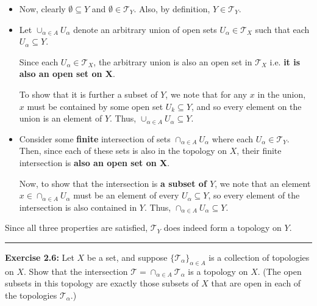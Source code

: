 \documentclass{article}
\begin{document}
\begin{itemize}
  \item Now, clearly $\emptyset \subseteq Y$ and $\emptyset \in \mathcal T_{Y}$. Also, by definition, $Y \in \mathcal T_Y$.
  \vskip 0.25cm

  \item Let $\cup_{\alpha \in A} U_{\alpha}$ denote an arbitrary union of open sets $U_{\alpha} \in \mathcal T_X$ such that each $U_{\alpha} \subseteq Y$.
  
  Since each $U_{\alpha} \in \mathcal T_X$, the arbitrary union is also an open set in $\mathcal T_X$ i.e. \textbf{it is also an open set on X}. 
  
  To show that it is further a subset of $Y$, we note that for any $x$ in the union, $x$ must be contained by some open set $U_k \subseteq Y$, and so every element on the union is an element of $Y$. Thus, $\cup_{\alpha \in A} U_{\alpha} \subseteq Y$.
  \vskip 0.25cm

  \item Consider some \textbf{finite} intersection of sets $\cap_{\alpha \in A} U_{\alpha}$ where each $U_{\alpha} \in \mathcal T_Y$. Then, since each of these sets is also in the topology on $X$, their finite intersection is \textbf{also an open set on X}.
  


  Now, to show that the intersection is \textbf{a subset of $Y$}, we note that an element $x \in \cap_{\alpha \in A} U_{\alpha}$ must be an element of every $U_{\alpha} \subseteq Y$, so every element of the intersection is also contained in $Y$. Thus, $\cap_{\alpha \in A} U_{\alpha} \subseteq Y$.
\end{itemize}

Since all three properties are satisfied, $\mathcal T_Y$ does indeed form a topology on $Y$.
\vskip 0.5cm
\hrule
\vskip 0.5cm

\textbf{Exercise 2.6:} Let $X$ be a set, and suppose $\{\mathcal T_\alpha\}_{\alpha \in A}$ is a collection of topologies on
$X$. Show that the intersection $\mathcal T = \cap_{\alpha \in A} \mathcal T_{\alpha}$ is a topology on $X$. (The open subsets in this topology are exactly those subsets of $X$ that are open in each of the topologies $\mathcal T_{\alpha}$.)

\vskip 0.5cm
\end{document}

